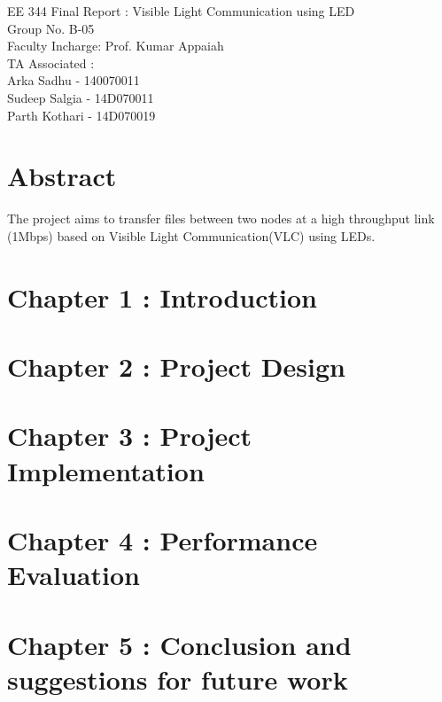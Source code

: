 \documentclass{article}
\begin{document}

EE 344 Final Report : Visible Light Communication using LED\\
Group No. B-05\\
Faculty Incharge: Prof. Kumar Appaiah\\
TA Associated : \\
Arka Sadhu - 140070011\\
Sudeep Salgia - 14D070011\\
Parth Kothari - 14D070019\\

\section{Abstract}

The project aims to transfer files between two nodes at a high throughput link (1Mbps) based on Visible Light Communication(VLC) using LEDs. 
\tableofcontents

\section{Chapter 1 : Introduction}
\section{Chapter 2 : Project Design}
\section{Chapter 3 : Project Implementation}

\section{Chapter 4 : Performance Evaluation}
\section{Chapter 5 : Conclusion and suggestions for future work}
\end{document}
